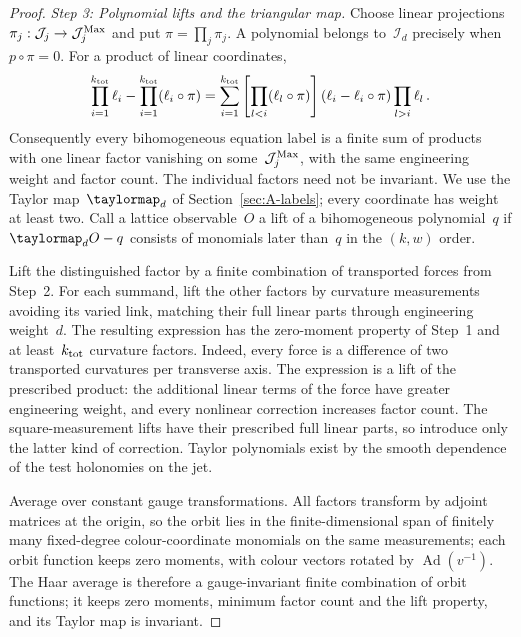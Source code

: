 \begin{proof}
\emph{Step 3: Polynomial lifts and the triangular map.} Choose linear projections $\pi_j:\mathcal J_j\to\mathcal J_j^{\rm Max}$ and put $\pi=\prod_j\pi_j$. A polynomial belongs to~$\mathcal I_d$ precisely when $p\circ\pi=0$. For a product of linear coordinates,
\begin{equation*}
\prod_{i=1}^{k_{\rm tot}}\ell_i-\prod_{i=1}^{k_{\rm tot}}(\ell_i\circ\pi)
=\sum_{i=1}^{k_{\rm tot}}\left[\prod_{l<i}(\ell_l\circ\pi)\right]
(\ell_i-\ell_i\circ\pi)\prod_{l>i}\ell_l\,.
\end{equation*}
Consequently every bihomogeneous equation label is a finite sum of products with one linear factor vanishing on some~$\mathcal J_j^{\rm Max}$, with the same engineering weight and factor count. The individual factors need not be invariant. We use the Taylor map~$\taylormap_{d}$ of Section~\ref{sec:A-labels}; every coordinate has weight at least two. Call a lattice observable~$O$ a lift of a bihomogeneous polynomial~$q$ if $\taylormap_{d}O-q$ consists of monomials later than~$q$ in the $(k,w)$ order.

Lift the distinguished factor by a finite combination of transported forces from Step~2. For each summand, lift the other factors by curvature measurements avoiding its varied link, matching their full linear parts through engineering weight~$d$. The resulting expression has the zero-moment property of Step~1 and at least~$k_{\rm tot}$ curvature factors. Indeed, every force is a difference of two transported curvatures per transverse axis. The expression is a lift of the prescribed product: the additional linear terms of the force have greater engineering weight, and every nonlinear correction increases factor count. The square-measurement lifts have their prescribed full linear parts, so introduce only the latter kind of correction. Taylor polynomials exist by the smooth dependence of the test holonomies on the jet.

Average over constant gauge transformations. All factors transform by adjoint matrices at the origin, so the orbit lies in the finite-dimensional span of finitely many fixed-degree colour-coordinate monomials on the same measurements; each orbit function keeps zero moments, with colour vectors rotated by $\operatorname{Ad}(v^{-1})$. The Haar average is therefore a gauge-invariant finite combination of orbit functions; it keeps zero moments, minimum factor count and the lift property, and its Taylor map is invariant.


\end{proof}

